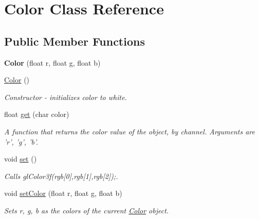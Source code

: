 \hypertarget{classColor}{
\section{Color Class Reference}
\label{classColor}
}
\subsection*{Public Member Functions}
\begin{DoxyCompactItemize}
\item 
\hypertarget{classColor_a373c542c99fb83ce9c7c08aae76b2718}{
{\bfseries Color} (float r, float g, float b)}
\label{classColor_a373c542c99fb83ce9c7c08aae76b2718}

\item 
\hypertarget{classColor_a9a742cbe9f9f4037f5d9f4e81a9b2428}{
\hyperlink{classColor_a9a742cbe9f9f4037f5d9f4e81a9b2428}{Color} ()}
\label{classColor_a9a742cbe9f9f4037f5d9f4e81a9b2428}

\begin{DoxyCompactList}\small\item\em Constructor -\/ initializes color to white. \item\end{DoxyCompactList}\item 
\hypertarget{classColor_a1cf39cdb0f05d4ad3548973c3b5957b5}{
float \hyperlink{classColor_a1cf39cdb0f05d4ad3548973c3b5957b5}{get} (char color)}
\label{classColor_a1cf39cdb0f05d4ad3548973c3b5957b5}

\begin{DoxyCompactList}\small\item\em A function that returns the color value of the object, by channel. Arguments are 'r', 'g', 'b'. \item\end{DoxyCompactList}\item 
\hypertarget{classColor_a4dabfcb970d79805cad2fa59a2ca839d}{
void \hyperlink{classColor_a4dabfcb970d79805cad2fa59a2ca839d}{set} ()}
\label{classColor_a4dabfcb970d79805cad2fa59a2ca839d}

\begin{DoxyCompactList}\small\item\em Calls glColor3f(rgb\mbox{[}0\mbox{]},rgb\mbox{[}1\mbox{]},rgb\mbox{[}2\mbox{]});. \item\end{DoxyCompactList}\item 
\hypertarget{classColor_ac1fcaeadc6072c342bd6b8b81bfed000}{
void \hyperlink{classColor_ac1fcaeadc6072c342bd6b8b81bfed000}{setColor} (float r, float g, float b)}
\label{classColor_ac1fcaeadc6072c342bd6b8b81bfed000}

\begin{DoxyCompactList}\small\item\em Sets r, g, b as the colors of the current \hyperlink{classColor}{Color} object. \item\end{DoxyCompactList}\end{DoxyCompactItemize}
